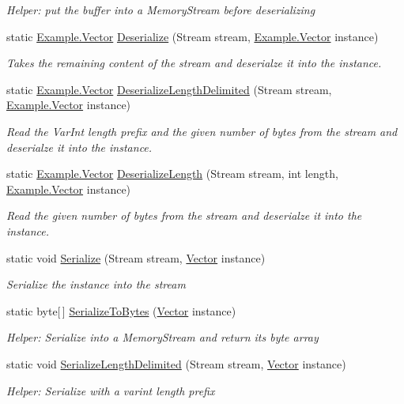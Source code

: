 \begin{DoxyCompactItemize}
\begin{DoxyCompactList}\small\item\em Helper\+: put the buffer into a Memory\+Stream before deserializing\end{DoxyCompactList}\item 
static \hyperlink{class_example_1_1_vector}{Example.\+Vector} \hyperlink{class_example_1_1_vector_a1eaf2f0f8c1289888fa799ad8c16fa21}{Deserialize} (Stream stream, \hyperlink{class_example_1_1_vector}{Example.\+Vector} instance)
\begin{DoxyCompactList}\small\item\em Takes the remaining content of the stream and deserialze it into the instance.\end{DoxyCompactList}\item 
static \hyperlink{class_example_1_1_vector}{Example.\+Vector} \hyperlink{class_example_1_1_vector_a3092148f5634ca0cc425bcb6f83c5533}{Deserialize\+Length\+Delimited} (Stream stream, \hyperlink{class_example_1_1_vector}{Example.\+Vector} instance)
\begin{DoxyCompactList}\small\item\em Read the Var\+Int length prefix and the given number of bytes from the stream and deserialze it into the instance.\end{DoxyCompactList}\item 
static \hyperlink{class_example_1_1_vector}{Example.\+Vector} \hyperlink{class_example_1_1_vector_aa5e9f156e0489ef1c5bc9578dfd545a1}{Deserialize\+Length} (Stream stream, int length, \hyperlink{class_example_1_1_vector}{Example.\+Vector} instance)
\begin{DoxyCompactList}\small\item\em Read the given number of bytes from the stream and deserialze it into the instance.\end{DoxyCompactList}\item 
static void \hyperlink{class_example_1_1_vector_af60b9bcba3c2dddfc4ef780c5d2786c6}{Serialize} (Stream stream, \hyperlink{class_example_1_1_vector}{Vector} instance)
\begin{DoxyCompactList}\small\item\em Serialize the instance into the stream\end{DoxyCompactList}\item 
static byte\mbox{[}$\,$\mbox{]} \hyperlink{class_example_1_1_vector_aae89c55b304738980925ebbcfdbfa946}{Serialize\+To\+Bytes} (\hyperlink{class_example_1_1_vector}{Vector} instance)
\begin{DoxyCompactList}\small\item\em Helper\+: Serialize into a Memory\+Stream and return its byte array\end{DoxyCompactList}\item 
static void \hyperlink{class_example_1_1_vector_ad5dad3812b90c5fe6669407f8588fbf5}{Serialize\+Length\+Delimited} (Stream stream, \hyperlink{class_example_1_1_vector}{Vector} instance)
\begin{DoxyCompactList}\small\item\em Helper\+: Serialize with a varint length prefix\end{DoxyCompactList}\end{DoxyCompactItemize}
